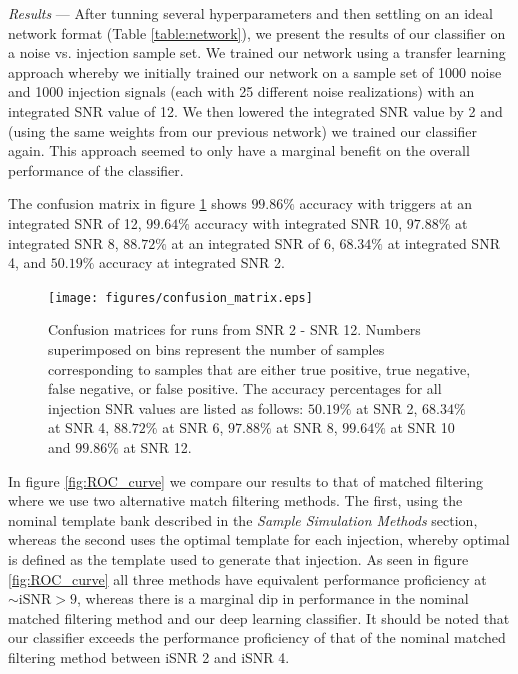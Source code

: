 \documentclass[%
 amsmath,amssymb,
 aps,
 twocolumn,
 prl,
 reprint,
floatfix,
]{revtex4-1}
\begin{document}
\textit{Results} --- After tunning several hyperparameters and then settling on an ideal network format (Table \ref{table:network}), we present the results of our classifier on a noise vs. injection sample set. We trained our network using a transfer learning approach whereby we initially trained our network on a sample set of 1000 noise and 1000 injection signals (each with 25 different noise realizations) with an integrated SNR value of 12. We then lowered the integrated SNR value by 2 and (using the same weights from our previous network) we trained our classifier again. This approach seemed to only have a marginal benefit on the overall performance of the classifier.  

The confusion matrix in figure \ref{fig:confusion} shows $99.86\%$ accuracy with triggers at an integrated SNR of 12, $99.64\%$ accuracy with integrated SNR 10, $97.88\%$ at integrated SNR 8, $88.72\%$ at an integrated SNR of 6, $68.34\%$ at integrated SNR 4, and $50.19\%$ accuracy at integrated SNR 2.


\begin{figure}[]
 
 \texttt{[image: figures/confusion\_matrix.eps]}
 \caption{\label{fig:confusion} Confusion matrices for runs from SNR 2 - SNR 12. Numbers superimposed on bins represent the number of samples corresponding to samples that are either true positive, true negative, false negative, or false positive. The accuracy percentages for all injection SNR values are listed as follows: $50.19\%$ at SNR 2, $68.34\%$ at SNR 4, $88.72\%$ at SNR 6, $97.88\%$ at SNR 8, $99.64\%$ at SNR 10 and $99.86\%$ at SNR 12.}
\end{figure}

In figure \ref{fig:ROC_curve} we compare our results to that of matched filtering where we use two alternative match filtering methods. The first, using the nominal template bank described in the \textit{Sample Simulation Methods} section, whereas the second uses the optimal template for each injection, whereby optimal is defined as the template used to generate that injection. As seen in figure \ref{fig:ROC_curve} all three methods have equivalent performance proficiency at $\sim \mathrm{iSNR} > 9$, whereas there is a marginal dip in performance in the nominal matched filtering method and our deep learning classifier. It should be noted that our classifier exceeds the performance proficiency of that of the nominal matched filtering method between iSNR 2 and iSNR 4. 
\end{document}
